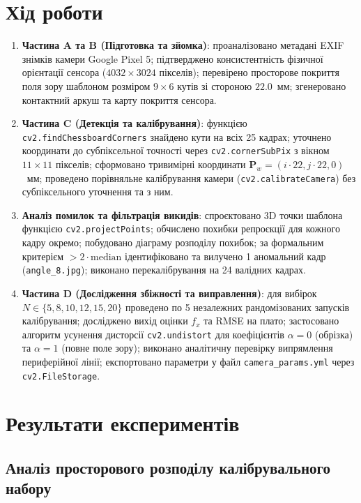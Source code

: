 \documentclass[14pt, a4paper]{extarticle}
\begin{document}
\section{Хід роботи}
\begin{enumerate}
    \item \textbf{Частина A та B (Підготовка та зйомка)}: проаналізовано метадані EXIF знімків камери Google Pixel 5; підтверджено консистентність фізичної орієнтації сенсора ($4032 \times 3024$ пікселів); перевірено просторове покриття поля зору шаблоном розміром $9 \times 6$ кутів зі стороною $22.0$~мм; згенеровано контактний аркуш та карту покриття сенсора.
    \item \textbf{Частина C (Детекція та калібрування)}: функцією \texttt{cv2.findChessboardCorners} знайдено кути на всіх 25 кадрах; уточнено координати до субпіксельної точності через \texttt{cv2.cornerSubPix} з вікном $11 \times 11$ пікселів; сформовано тривимірні координати $\mathbf{P}_w = (i \cdot 22, j \cdot 22, 0)$~мм; проведено порівняльне калібрування камери (\texttt{cv2.calibrateCamera}) без субпіксельного уточнення та з ним.
    \item \textbf{Аналіз помилок та фільтрація викидів}: спроєктовано 3D точки шаблона функцією \texttt{cv2.projectPoints}; обчислено похибки репроєкції для кожного кадру окремо; побудовано діаграму розподілу похибок; за формальним критерієм $> 2 \cdot \text{median}$ ідентифіковано та вилучено 1 аномальний кадр (\texttt{angle\_8.jpg}); виконано перекалібрування на 24 валідних кадрах.
    \item \textbf{Частина D (Дослідження збіжності та виправлення)}: для вибірок $N \in \{5, 8, 10, 12, 15, 20\}$ проведено по 5 незалежних рандомізованих запусків калібрування; досліджено вихід оцінки $f_x$ та RMSE на плато; застосовано алгоритм усунення дисторсії \texttt{cv2.undistort} для коефіцієнтів $\alpha = 0$ (обрізка) та $\alpha = 1$ (повне поле зору); виконано аналітичну перевірку випрямлення периферійної лінії; експортовано параметри у файл \texttt{camera\_params.yml} через \texttt{cv2.FileStorage}.
\end{enumerate}

\section{Результати експериментів}

\subsection{Аналіз просторового розподілу калібрувального набору}
\end{document}
